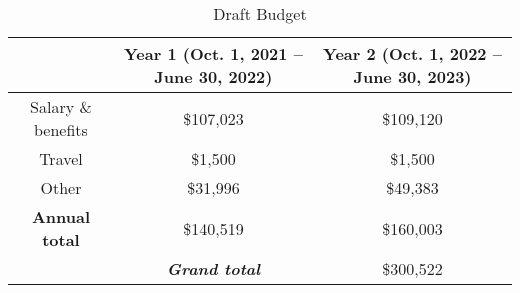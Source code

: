 \documentclass[12pt]{elsarticle}
\begin{document}
		\begin{table}[h]
				\caption{Draft Budget} 	
				\begin{tabular}{ c|cc } \hline

			\hline
			 & Year 1 (Oct. 1, 2021 -- June 30, 2022) & Year 2 (Oct. 1, 2022 -- June 30, 2023) \\\hline
			\rowcolor[gray]{.9} Salary \& benefits &  \$107,023  & \$109,120 \\ 
			Travel & \$1,500 & \$1,500 \\
			\rowcolor[gray]{.9} Other & \$31,996 & \$49,383 \\
			\hline
			\textbf{Annual total} & \$140,519 & \$160,003 \\
			\hline
			& \textbf{\textit{Grand total}} & \$300,522 \\
			\hline
		\end{tabular}
	\end{table}
	
	
	
	\clearpage
	\footnotesize
	
\end{document}
